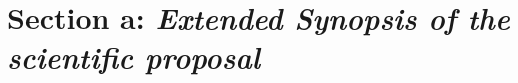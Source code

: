 \section*{Section a: \textit{Extended Synopsis of the scientific proposal}}

\cite{Montero2018_RegularPolyhedra3,Montero2018_RegularPolyhedra3}
